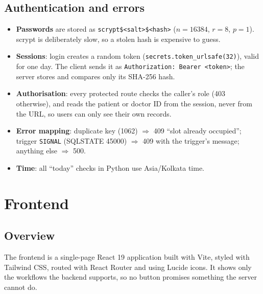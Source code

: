 \documentclass[11pt,a4paper]{article}
\newcommand{\code}[1]{\texttt{#1}}
\begin{document}
\subsection{Authentication and errors}

\begin{itemize}
  \item \textbf{Passwords} are stored as \code{scrypt\$<salt>\$<hash>} ($n = 16384$, $r = 8$, $p = 1$). scrypt is deliberately slow, so a stolen hash is expensive to guess.
  \item \textbf{Sessions}: login creates a random token (\code{secrets.token\_urlsafe(32)}), valid for one day. The client sends it as \code{Authorization: Bearer <token>}; the server stores and compares only its SHA-256 hash.
  \item \textbf{Authorisation}: every protected route checks the caller's role (403 otherwise), and reads the patient or doctor ID from the session, never from the URL, so users can only see their own records.
  \item \textbf{Error mapping}: duplicate key (1062) $\Rightarrow$ 409 ``slot already occupied''; trigger \code{SIGNAL} (SQLSTATE 45000) $\Rightarrow$ 409 with the trigger's message; anything else $\Rightarrow$ 500.
  \item \textbf{Time}: all ``today'' checks in Python use Asia/Kolkata time.
\end{itemize}

\section{Frontend}

\subsection{Overview}

The frontend is a single-page React 19 application built with Vite, styled with Tailwind CSS, routed with React Router and using Lucide icons. It shows only the workflows the backend supports, so no button promises something the server cannot do.
\end{document}
